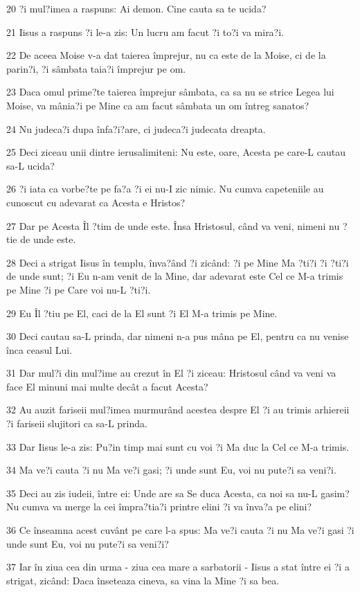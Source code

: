 \par 20 ?i mul?imea a raspuns: Ai demon. Cine cauta sa te ucida?
\par 21 Iisus a raspuns ?i le-a zis: Un lucru am facut ?i to?i va mira?i.
\par 22 De aceea Moise v-a dat taierea împrejur, nu ca este de la Moise, ci de la parin?i, ?i sâmbata taia?i împrejur pe om.
\par 23 Daca omul prime?te taierea împrejur sâmbata, ca sa nu se strice Legea lui Moise, va mânia?i pe Mine ca am facut sâmbata un om întreg sanatos?
\par 24 Nu judeca?i dupa înfa?i?are, ci judeca?i judecata dreapta.
\par 25 Deci ziceau unii dintre ierusalimiteni: Nu este, oare, Acesta pe care-L cautau sa-L ucida?
\par 26 ?i iata ca vorbe?te pe fa?a ?i ei nu-I zic nimic. Nu cumva capeteniile au cunoscut cu adevarat ca Acesta e Hristos?
\par 27 Dar pe Acesta Îl ?tim de unde este. Însa Hristosul, când va veni, nimeni nu ?tie de unde este.
\par 28 Deci a strigat Iisus în templu, înva?ând ?i zicând: ?i pe Mine Ma ?ti?i ?i ?ti?i de unde sunt; ?i Eu n-am venit de la Mine, dar adevarat este Cel ce M-a trimis pe Mine ?i pe Care voi nu-L ?ti?i.
\par 29 Eu Îl ?tiu pe El, caci de la El sunt ?i El M-a trimis pe Mine.
\par 30 Deci cautau sa-L prinda, dar nimeni n-a pus mâna pe El, pentru ca nu venise înca ceasul Lui.
\par 31 Dar mul?i din mul?ime au crezut în El ?i ziceau: Hristosul când va veni va face El minuni mai multe decât a facut Acesta?
\par 32 Au auzit fariseii mul?imea murmurând acestea despre El ?i au trimis arhiereii ?i fariseii slujitori ca sa-L prinda.
\par 33 Dar Iisus le-a zis: Pu?in timp mai sunt cu voi ?i Ma duc la Cel ce M-a trimis.
\par 34 Ma ve?i cauta ?i nu Ma ve?i gasi; ?i unde sunt Eu, voi nu pute?i sa veni?i.
\par 35 Deci au zis iudeii, între ei: Unde are sa Se duca Acesta, ca noi sa nu-L gasim? Nu cumva va merge la cei împra?tia?i printre elini ?i va înva?a pe elini?
\par 36 Ce înseamna acest cuvânt pe care l-a spus: Ma ve?i cauta ?i nu Ma ve?i gasi ?i unde sunt Eu, voi nu pute?i sa veni?i?
\par 37 Iar în ziua cea din urma - ziua cea mare a sarbatorii - Iisus a stat între ei ?i a strigat, zicând: Daca înseteaza cineva, sa vina la Mine ?i sa bea.
